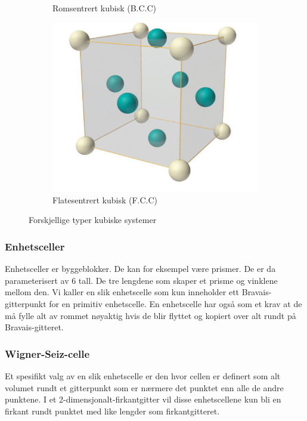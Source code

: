 \documentclass{article}
\begin{document}
\begin{figure}[H]
\begin{subfigure}{0.3\textwidth}
    \caption{Romsentrert kubisk (B.C.C)}
    \label{fig:romsentert_kubisk}
  \end{subfigure}
  \begin{subfigure}{0.3\textwidth}
    \includegraphics[width=\linewidth]{bilder/flatesentrert_kubisk.png}
    \caption{Flatesentrert kubisk (F.C.C)}
    \label{fig:flatesentrert_kubisk}
  \end{subfigure}
  \caption{Forskjellige typer kubiske systemer}
  \label{fig:kubiske_interpolasjoner}
\end{figure}
\subsubsection{Enhetsceller}
Enhetsceller er byggeblokker. De kan for eksempel være prismer. De er da parameterisert av 6 tall. De tre lengdene som skaper et prisme og vinklene mellom den. Vi kaller en slik enhetscelle som kun inneholder ett Bravais-gitterpunkt for en primitiv enhetscelle. En enhetscelle har også som et krav at de må fylle alt av rommet nøyaktig hvis de blir flyttet og kopiert over alt rundt på Bravais-gitteret.
\subsubsection{Wigner-Seiz-celle}
Et spesifikt valg av en slik enhetscelle er den hvor cellen er definert som alt volumet rundt et gitterpunkt som er nærmere det punktet enn alle de andre punktene. I et 2-dimensjonalt-firkantgitter vil disse enhetscellene kun bli en firkant rundt punktet med like lengder som firkantgitteret.
\end{document}
